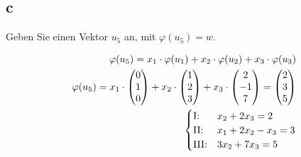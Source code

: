 \subsection{c}
Geben Sie einen Vektor $u_5$ an, mit $\varphi(u_5) = w$.

\begin{align*}
    \varphi(u_5) = x_1 \cdot \varphi(u_1) + x_2 \cdot \varphi(u_2) + x_3 \cdot \varphi(u_3)                     \\
    \varphi(u_5) = x_1 \cdot \begin{pmatrix}
                                 0 \\ 1 \\ 0
                             \end{pmatrix} + x_2 \cdot \begin{pmatrix}
                                                           1 \\ 2 \\ 3
                                                       \end{pmatrix} + x_3 \cdot \begin{pmatrix}
                                                                                     2 \\ -1 \\ 7
                                                                                 \end{pmatrix} = \begin{pmatrix}
                                                                                                     2 \\ 3 \\ 5
                                                                                                 \end{pmatrix} \\
    \begin{cases}
        \text{I:\@}   & x_2 + 2x_3 = 2       \\
        \text{II:\@}  & x_1 + 2x_2 - x_3 = 3 \\
        \text{III:\@} & 3x_2 + 7x_3 = 5
    \end{cases}
\end{align*}

